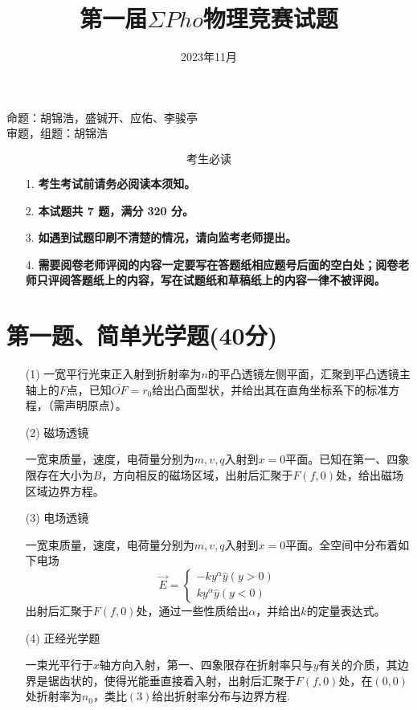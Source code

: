 \documentclass{article}
\title{\textbf{第一届$\Sigma Pho$物理竞赛试题}}
\date{2023年11月}
\begin{document}
\maketitle
\begin{flushright}
    命题：胡锦浩，盛铖开、应佑、李骏亭\\
	审题，组题：胡锦浩
\end{flushright}
$$\textbf{考生必读}$$
\begin{itemize}
\item[1.]\textbf{考生考试前请务必阅读本须知。}
\item[2.]\textbf{本试题共 7 题，满分 320 分。}
\item[3.]\textbf{如遇到试题印刷不清楚的情况，请向监考老师提出。}
\item[4.]\textbf{需要阅卷老师评阅的内容一定要写在答题纸相应题号后面的空白处；阅卷老师只评阅答题纸上的内容，写在试题纸和草稿纸上的内容一律不被评阅。}
\end{itemize}

\section*{第一题、简单光学题(40分)}
\begin{itemize}
\item[(1)]一宽平行光束正入射到折射率为$n$的平凸透镜左侧平面，汇聚到平凸透镜主轴上的$F$点，已知$\overline{OF}=r_0$给出凸面型状，并给出其在直角坐标系下的标准方程，（需声明原点）。
\item[(2)]磁场透镜\par
一宽束质量，速度，电荷量分别为$m,v,q$入射到$x=0$平面。已知在第一、四象限存在大小为$B$，方向相反的磁场区域，出射后汇聚于$F(f,0)$处，给出磁场区域边界方程。
\item[(3)]电场透镜\par
一宽束质量，速度，电荷量分别为$m,v,q$入射到$x=0$平面。全空间中分布着如下电场
\[
\vec{E}=
\begin{cases}
-ky^{\alpha}\hat{y}(y>0)\\
ky^{\alpha}\hat{y}(y<0)
\end{cases}
\]
出射后汇聚于$F(f,0)$处，通过一些性质给出$\alpha$，并给出$k$的定量表达式。
\item[(4)]正经光学题\par
一束光平行于$x$轴方向入射，第一、四象限存在折射率只与$y$有关的介质，其边界是锯齿状的，使得光能垂直接着入射，出射后汇聚于$F(f,0)$处，在$(0,0)$处折射率为$n_0$，类比$(3)$给出折射率分布与边界方程.
\end{itemize}
\clearpage
\end{document}
